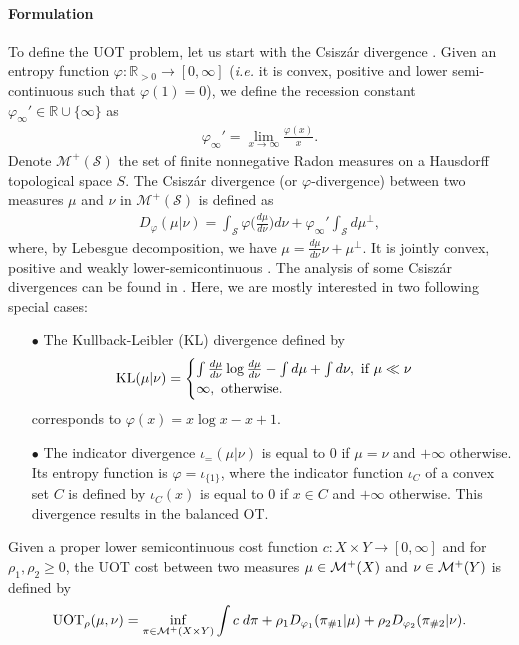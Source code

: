 \paragraph{Formulation} To define the UOT problem, let us start with
the Csiszár divergence \citep{Csiszar63}. Given an entropy function
$\varphi : \mathbb R_{> 0} \to [0, \infty]$ (\textit{i.e.} it is convex,
positive and lower semi-continuous such that $\varphi(1) = 0$), we define
the recession constant $\varphi_{\infty}' \in \mathbb R \cup \{ \infty \}$ as
\begin{align}
  \varphi_{\infty}' = \lim_{x \to \infty} \frac{\varphi(x)}{x}.
\end{align}
Denote $\mathcal M^+(\mathcal S)$ the set of finite nonnegative Radon measures on a
Hausdorff topological space $S$. The Csiszár divergence (or $\varphi$-divergence) between
two measures $\mu$ and $\nu$ in $\mathcal M^+(\mathcal S)$ is defined as
\begin{align}
  D_{\varphi}(\mu \vert \nu) = \int_\mathcal S \varphi \Big( \frac{d\mu}{d\nu} \Big) d\nu +
  \varphi_{\infty}' \int_\mathcal S d\mu^{\perp},
\end{align}
where, by Lebesgue decomposition, we have $\mu = \frac{d\mu}{d\nu} \nu + \mu^{\perp}$.
It is jointly convex, positive and weakly lower-semicontinuous \citep{Liero18}.
The analysis of some Csiszár divergences can be found in \citep{Sejourne19}.
Here, we are mostly interested in two following special cases:
\begin{itemize}
  \item[$\bullet$] The Kullback-Leibler (KL) divergence defined by
  \begin{align}
    \text{KL}(\mu \vert \nu) =
    \begin{cases}
      \int \frac{d \mu}{ d \nu} \log \frac{d \mu}{ d \nu} - \int d\mu + \int d\nu,
      \text{ if } \mu \ll \nu \\
      \infty, \text{ otherwise}.
    \end{cases}
  \end{align}
  corresponds to $\varphi(x) = x \log x - x + 1$.

  \item[$\bullet$] The indicator divergence $\iota_{=}(\mu \vert \nu)$ is equal to $0$
  if $\mu = \nu$ and $+\infty$ otherwise.
  Its entropy function is $\varphi = \iota_{\{ 1 \}}$, where the indicator function $\iota_C$
  of a convex set $C$ is defined by $\iota_C(x)$ is equal to $0$ if $x\in C$ and $+\infty$ otherwise.
  This divergence results in the balanced OT.
\end{itemize}
Given a proper lower semicontinuous cost function $c: X \times Y \to [0, \infty]$
and for $\rho_1, \rho_2 \geq 0$, the UOT cost between two measures $\mu \in \mathcal M^+(X)$ and
$\nu \in \mathcal M^+(Y)$ is defined by
\begin{align}
  \text{UOT}_{\rho}(\mu, \nu) = \inf_{\pi \in \mathcal M^+(X \times Y)} \int c \; d\pi
  + \rho_1 D_{\varphi_1}(\pi_{\# 1} | \mu)
  + \rho_2 D_{\varphi_2}(\pi_{\# 2} | \nu).
\end{align}

